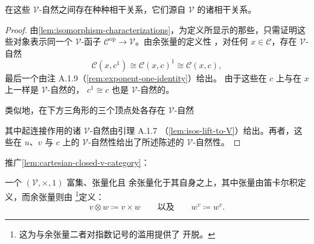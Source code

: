 在这些 $\mathcal{V}$-自然\trIsomorphism{}之间存在种种相干关系，它们源自%
\trCartesianClosed{}\trCategory{} $\mathcal{V}$ 的诸相干关系。

\begin{proof}
由\cref{lem:isomorphism-characterizations}，为定义所显示的那些\trIsomorphism，只需证明这些对象表示同一个
$\mathcal{V}$-函子 $\mathcal{C}^{\mathrm{op}}\to\mathcal{V}$。由余张量的定义性%
\trUniversalProperty，对任何 $x\in\mathcal{C}$，存在 $\mathcal{V}$-自然%
\trIsomorphism
\[ \mathcal{C}(x,c^{1})\cong\mathcal{C}(x,c)^{1}\cong\mathcal{C}(x,c), \]
最后一个\trIsomorphism{}由注 A.1.9（\cref{rem:exponent-one-identity}）给出。
由于这些\trIsomorphism{}在 $c$ 上与在 $x$ 上一样是 $\mathcal{V}$-自然的，
\trIsomorphism{} $c^{1}\cong c$ 也是 $\mathcal{V}$-自然的。

类似地，在下方三角形的三个顶点处各存在 $\mathcal{V}$-自然\trIsomorphism
\begin{center}
\end{center}
其中起连接作用的诸 $\mathcal{V}$-自然\trIsomorphism{}由引理 A.1.7
（\cref{lem:isos-lift-to-V}）给出。再者，这些\trIsomorphism{}在 $u$、$v$ 与
$c$ 上的 $\mathcal{V}$-自然性给出了所述陈述的 $\mathcal{V}$-自然性。
\end{proof}

推广\cref{lem:cartesian-closed-v-category}：

\begin{lemma}\label{lem:cartesian-closed-self-tensored}
一个\trCartesianClosed{}\trCategory{} $(\mathcal{V},\times,1)$ 富集、张量化且
余张量化于其自身之上，其中张量由笛卡尔积定义，而余张量则由%
\trInternalHom\footnote{这为\trInternalHom{}与余张量二者对指数记号的滥用提供了
开脱。}定义：
\[ v\otimes w\coloneqq v\times w
   \qquad\text{以及}\qquad
   w^{v}\coloneqq w^{v}. \]
\end{lemma}

